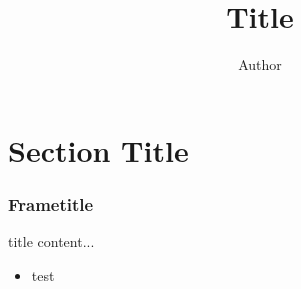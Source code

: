 \documentclass{beamer}
\title{Title}
\author{Author}
\institute{Institute}
\begin{document}
\begin{frame}
\titlepage
\end{frame}

\section{Section Title}

\begin{frame}
  \frametitle{Frametitle}
  \begin{block}{title}
  content...
  \end{block}
  
  \begin{itemize}
  \item test
  \end{itemize}
\end{frame}
\end{document}
